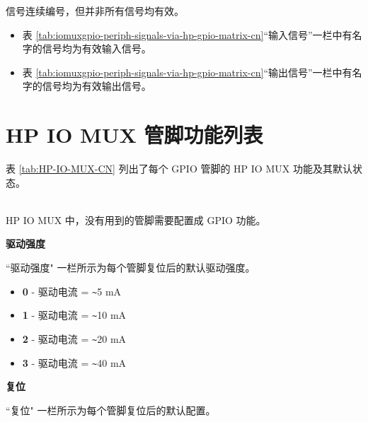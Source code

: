 \documentclass[main\_\_CN.tex]{subfiles}
\begin{document}
\begin{tiplisting}
信号连续编号，但并非所有信号均有效。
\vspace{-1em}
\begin{itemize}
    \item 表 \ref{tab:iomuxgpio-periph-signals-via-hp-gpio-matrix-cn}“输入信号”一栏中有名字的信号均为有效输入信号。
    \item 表 \ref{tab:iomuxgpio-periph-signals-via-hp-gpio-matrix-cn}“输出信号”一栏中有名字的信号均为有效输出信号。
\end{itemize}
\end{tiplisting}

\begin{landscape}

\tableheaderHPSignalCN
\tablecontentHPSignal

\end{landscape}

\section{HP IO MUX 管脚功能列表}
\label{sec:hp_iomux_pads}
表 \ref{tab:HP-IO-MUX-CN} 列出了每个 GPIO 管脚的 HP IO MUX 功能及其默认状态。
\begin{landscape}

\tableheaderHPFunctionsCN
\tablecontentHPFunctions

\begin{importantlisting}\\
    HP IO MUX 中，没有用到的管脚需要配置成 GPIO 功能。
\end{importantlisting}

\end{landscape}

\normalsize

\textbf{驱动强度}

``驱动强度" 一栏所示为每个管脚复位后的默认驱动强度。

\begin{itemize}
\item \textbf{0} - 驱动电流 = \verb+~+5 mA
\item \textbf{1} - 驱动电流 = \verb+~+10 mA
\item \textbf{2} - 驱动电流 = \verb+~+20 mA
\item \textbf{3} - 驱动电流 = \verb+~+40 mA
\end{itemize}
\textbf{复位}

``复位" 一栏所示为每个管脚复位后的默认配置。
\end{document}
